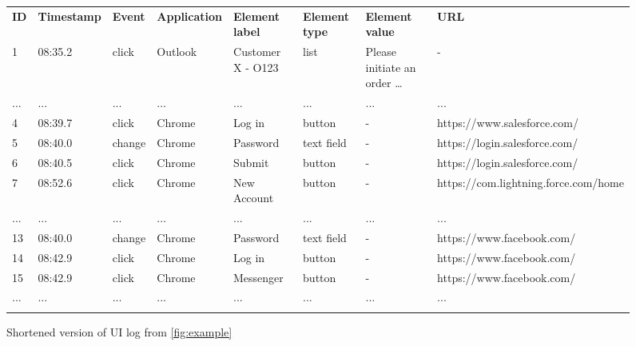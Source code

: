 

\begin{figure}[h!]
	\centering
	\begin{adjustbox}{max width=\textwidth}
		\begin{tabular}{llllllll}
			\hline\noalign{\smallskip}\noalign{\smallskip}
			\textbf{ID} &\textbf{Timestamp}&\textbf{Event}&\textbf{Application}&\textbf{Element label}&\textbf{Element type}&\textbf{Element value}&\textbf{URL}\\
			\noalign{\smallskip}\hline\noalign{\smallskip}
			1&08:35.2&click&Outlook&Customer X - O123&list&Please initiate an order …&-\\\noalign{\smallskip}
			...&...&...&...&...&...&...&...\\
			4&08:39.7&click&Chrome&Log in&button&-&https://www.salesforce.com/\\\noalign{\smallskip}
			5&08:40.0&change&Chrome&Password&text field&-&https://login.salesforce.com/\\\noalign{\smallskip}
			6&08:40.5&click&Chrome&Submit&button&-&https://login.salesforce.com/\\\noalign{\smallskip}
			7&08:52.6&click&Chrome&New Account&button&-&https://com.lightning.force.com/home\\\noalign{\smallskip}
			...&...&...&...&...&...&...&...\\
			13&08:40.0&change&Chrome&Password&text field&-&https://www.facebook.com/\\\noalign{\smallskip}
			14&08:42.9&click&Chrome&Log in&button&-&https://www.facebook.com/\\\noalign{\smallskip}
			15&08:42.9&click&Chrome&Messenger&button&-&https://www.facebook.com/\\\noalign{\smallskip}
			...&...&...&...&...&...&...&...\\
			\hline\noalign{\smallskip}
		\end{tabular}
	\end{adjustbox}
	\caption{Shortened version of UI log from \autoref{fig:example}}
	\label{fig:example_short}
\end{figure}


